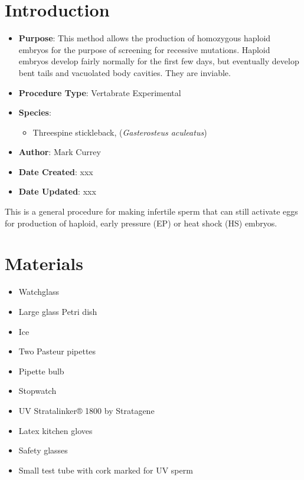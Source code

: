 \documentclass[
  letterpaper,
  DIV=11,
  numbers=noendperiod]{scrreprt}
\providecommand{\tightlist}{%
  \setlength{\itemsep}{0pt}\setlength{\parskip}{0pt}}\usepackage{longtable,booktabs,array}
\begin{document}
\hypertarget{introduction-89}{%
\section{Introduction}\label{introduction-89}}

\begin{itemize}
\tightlist
\item
  \textbf{Purpose}: This method allows the production of homozygous
  haploid embryos for the purpose of screening for recessive mutations.
  Haploid embryos develop fairly normally for the first few days, but
  eventually develop bent tails and vacuolated body cavities. They are
  inviable.
\item
  \textbf{Procedure Type}: Vertabrate Experimental
\item
  \textbf{Species}:

  \begin{itemize}
  \tightlist
  \item
    Threespine stickleback, (\emph{Gasterosteus aculeatus})
  \end{itemize}
\item
  \textbf{Author}: Mark Currey
\item
  \textbf{Date Created}: xxx
\item
  \textbf{Date Updated}: xxx
\end{itemize}

This is a general procedure for making infertile sperm that can still
activate eggs for production of haploid, early pressure (EP) or heat
shock (HS) embryos.

\hypertarget{materials-84}{%
\section{Materials}\label{materials-84}}

\begin{itemize}
\tightlist
\item
  Watchglass
\item
  Large glass Petri dish
\item
  Ice
\item
  Two Pasteur pipettes
\item
  Pipette bulb
\item
  Stopwatch
\item
  UV Stratalinker® 1800 by Stratagene\\
\item
  Latex kitchen gloves
\item
  Safety glasses
\item
  Small test tube with cork marked for UV sperm
\end{itemize}
\end{document}
